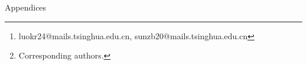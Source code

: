 \documentclass[a4paper]{article}
\title{\papertitle}
\author{
Kairong Luo\tsup{1}\thanks{luokr24@mails.tsinghua.edu.cn, sunzb20@mails.tsinghua.edu.cn}, 
Zhenbo Sun\tsup{1}\footnotemark[1],
Xinyu Shi\tsup{1}, Shengqi Chen\tsup{1}, Bowen Yu\tsup{3}, Yunyi Chen\tsup{1}, Chenyi Dang\tsup{1},\\
\bf\ 
Hengtao Tao\tsup{2},
Hui Wang\tsup{2},
Fangming Liu\tsup{2}, 
Kaifeng Lyu\tsup{1},
Wenguang Chen\tsup{1,2}\setcounter{footnote}{1}\thanks{Corresponding authors.}\\
\tsup{1}Tsinghua University, \tsup{2}Peng Cheng Laboratory, \tsup{3}Beijing Houdu Technology Co., Ltd%
}
\begin{document}
\maketitle
\thispagestyle{firstpage}














\clearpage

\appendix

\begin{center}
\Large
Appendices
\end{center}


\end{document}
